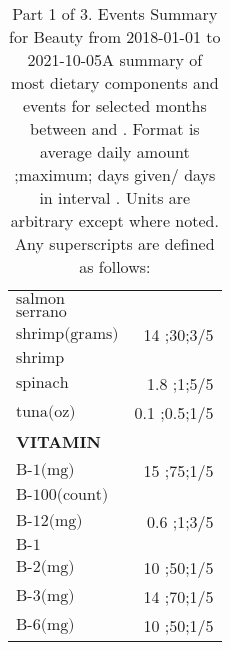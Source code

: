 \begin{table}[H]
\begin{tabular}{|l|r|}
$\textrm{salmon}$&\\
$\textrm{serrano}$&\\
$\textrm{shrimp(grams)}$&14 ;30;3/5\\
$\textrm{shrimp}$&\\
$\textrm{spinach}$&1.8 ;1;5/5\\
$\textrm{tuna(oz)}$&0.1 ;0.5;1/5\\
{\bf VITAMIN}&\\
$\textrm{B-1(mg)}$&15 ;75;1/5\\
$\textrm{B-100(count)}$&\\
$\textrm{B-12(mg)}$&0.6 ;1;3/5\\
$\textrm{B-1}$&\\
$\textrm{B-2(mg)}$&10 ;50;1/5\\
$\textrm{B-3(mg)}$&14 ;70;1/5\\
$\textrm{B-6(mg)}$&10 ;50;1/5\\
\hline
\end{tabular}
\caption{Part 1 of 3.  Events Summary for Beauty   from 2018-01-01 to 2021-10-05A summary of most dietary components and events  for selected months between \mjmdatemin and \mjmdatemax. Format is average daily amount ;maximum; days given/ days in interval . Units are arbitrary except where noted. Any  superscripts are defined as follows:  \mjmsuperscripts}
\end{table}
